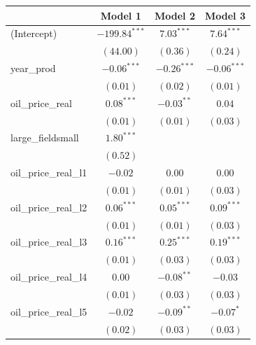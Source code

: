 \documentclass[12pt]{article}
\begin{document}
\begin{table}
\begin{center}
\begin{tabular}{l c c c }
\hline
                                     & Model 1 & Model 2 & Model 3 \\
\hline
(Intercept)                          & $-199.84^{***}$ & $7.03^{***}$   & $7.64^{***}$    \\
                                     & $(44.00)$       & $(0.36)$       & $(0.24)$        \\
year_prod                            & $-0.06^{***}$   & $-0.26^{***}$  & $-0.06^{***}$   \\
                                     & $(0.01)$        & $(0.02)$       & $(0.01)$        \\
oil_price_real                       & $0.08^{***}$    & $-0.03^{**}$   & $0.04$          \\
                                     & $(0.01)$        & $(0.01)$       & $(0.03)$        \\
large_fieldsmall                     & $1.80^{***}$    &                &                 \\
                                     & $(0.52)$        &                &                 \\
oil_price_real_l1                    & $-0.02$         & $0.00$         & $0.00$          \\
                                     & $(0.01)$        & $(0.01)$       & $(0.03)$        \\
oil_price_real_l2                    & $0.06^{***}$    & $0.05^{***}$   & $0.09^{***}$    \\
                                     & $(0.01)$        & $(0.01)$       & $(0.03)$        \\
oil_price_real_l3                    & $0.16^{***}$    & $0.25^{***}$   & $0.19^{***}$    \\
                                     & $(0.01)$        & $(0.03)$       & $(0.03)$        \\
oil_price_real_l4                    & $0.00$          & $-0.08^{**}$   & $-0.03$         \\
                                     & $(0.01)$        & $(0.03)$       & $(0.03)$        \\
oil_price_real_l5                    & $-0.02$         & $-0.09^{**}$   & $-0.07^{*}$     \\
                                     & $(0.02)$        & $(0.03)$       & $(0.03)$        \\

\end{tabular}
\end{center}
\end{table}
\end{document}
